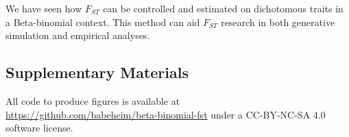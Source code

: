 \documentclass[11pt]{article}
\begin{document}
We have seen how $F_{ST}$ can be controlled and estimated on dichotomous traits in a Beta-binomial context. This method can aid $F_{ST}$ research in both generative simulation and empirical analyses.

\newpage

\subsection*{Supplementary Materials}

All code to produce figures is available at \\\url{https://github.com/babeheim/beta-binomial-fst} under a CC-BY-NC-SA 4.0 software license.

\end{document}
